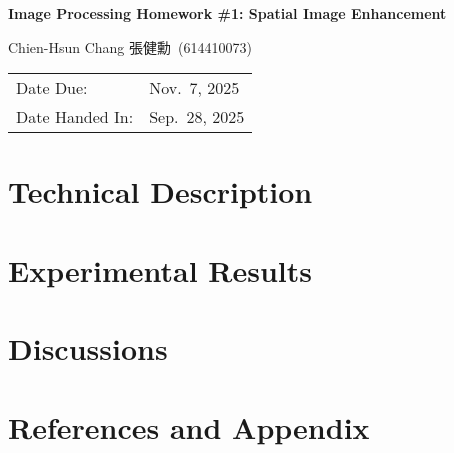 \documentclass[12pt,a4paper]{article}
\newcommand{\HomeworkTitle}{Image Processing Homework \#1: Spatial Image Enhancement}
\newcommand{\StudentName}{Chien-Hsun Chang 張健勳}
\newcommand{\StudentID}{614410073}
\newcommand{\StudentInfo}{\StudentName~(\StudentID)}
\newcommand{\DateDue}{Nov.\ 7, 2025}
\newcommand{\DateHandedIn}{Sep.\ 28, 2025}
\begin{document}
\begin{titlepage}
	\centering
	{\vspace*{2cm}\Huge\bfseries \HomeworkTitle\par}
	\vspace{2cm}
    {\Large \StudentInfo\par}
	\vfill
	\begin{tabular}{ll}
		Date Due: & {\DateDue} \\
		Date Handed In: & {\DateHandedIn} \\
	\end{tabular}
	\vfill
\end{titlepage}

\section{Technical Description}

\section{Experimental Results}

\section{Discussions}

\section{References and Appendix}
\end{document}
